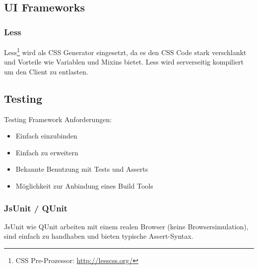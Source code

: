 		\subsection{UI Frameworks}
			\subsubsection{Less}
				Less\footnote{CSS Pre-Prozessor: \url{http://lesscss.org/}} wird als CSS Generator eingesetzt, da es den CSS Code stark verschlankt und Vorteile wie Variablen und Mixins bietet.
				Less wird serverseitig kompiliert um den Client zu entlasten.
				
		\subsection{Testing}
			Testing Framework Anforderungen:
			\begin{itemize}
				\item Einfach einzubinden
				\item Einfach zu erweitern
				\item Bekannte Benutzung mit Tests und Asserts
				\item Möglichkeit zur Anbindung eines Build Tools
			\end{itemize}

			\subsubsection{JsUnit / QUnit} %
				JsUnit wie QUnit arbeiten mit einem realen Browser (keine Browsersimulation), 
				sind einfach zu handhaben und bieten typische Assert-Syntax.
				
				
